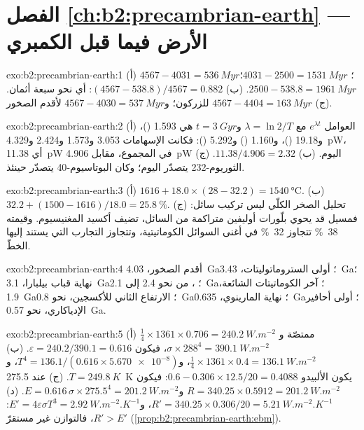 \section*{الفصل \ref{ch:b2:precambrian-earth} --- الأرض فيما قبل الكمبري}

\begin{solution}{exo:b2:precambrian-earth:1}
(أ)  $4567 - 4031 = \qty{536}{Myr}$؛  $4031 - 2500 = \qty{1531}{Myr}$؛
 $2500 - 538.8 = \qty{1961}{Myr}$. (ب) $(4567 - 538.8)/4567 = 0.882$: أي نحو سبعة
أثمان. (ج) $4567 - 4404 = \qty{163}{Myr}$ للزركون؛ و$4567 - 4030 = \qty{537}{Myr}$
لأقدم الصخور.
\end{solution}

\begin{solution}{exo:b2:precambrian-earth:2}
(أ) العوامل $e^{\lambda t}$ مع $\lambda = \ln2/T$ و$t = \qty{3}{Gyr}$ هي 1.593
()، و19.18 ()، و1.160 () و5.292 (): فكانت
الإسهامات 3.053 و1.573 و2.424 و\qty{4.329}{pW}، أي \qty{11.38}{pW} في المجموع، مقابل
\qty{4.906}{pW} اليوم. (ب) $11.38/4.906 = 2.32$. (ج) الثوريوم-232 يتصدّر اليوم؛ وكان البوتاسيوم-40 يتصدّر
حينئذ.
\end{solution}

\begin{solution}{exo:b2:precambrian-earth:3}
(أ) $1616 + 18.0\times(28 - 32.2) = \qty{1540}{\celsius}$. (ب) $32.2 + (1500 - 1616)/18.0 =
\qty{25.8}{\percent}$. (ج) تحليل الصخر الكلّي ليس تركيب سائل: فمسيل
 قد يحوي بلّورات أوليفين متراكمة من السائل، تضيف أكسيد المغنيسيوم. وقيمته
\qty{38}{\percent} تتجاوز \qty{32}{\percent} في أغنى السوائل الكوماتيتية، وتتجاوز
التجارب التي يستند إليها الخطّ.
\end{solution}

\begin{solution}{exo:b2:precambrian-earth:4}
أقدم الصخور، \qty{4.03}{Ga}؛ أولى الستروماتوليتات، \qty{3.43}{Ga}؛ نهاية قباب بيلبارا،
\qty{3.1}{Ga}؛ ، من نحو 2.4 إلى \qty{2.1}{Ga}؛ آخر الكوماتيتات الشائعة،
\qty{1.9}{Ga}؛ الارتفاع الثاني للأكسجين، نحو \qty{0.8}{Ga}؛ نهاية المارينوي،
\qty{0.635}{Ga}؛ أولى أحافير الإدياكاري، نحو \qty{0.57}{Ga}.
\end{solution}

\begin{solution}{exo:b2:precambrian-earth:5}
(أ) $\tfrac14\times1361\times0.706 = \qty{240.2}{W.m^{-2}}$ ممتصّة و$\sigma\times288^4 =
\qty{390.1}{W.m^{-2}}$، فيكون $\varepsilon = 240.2/390.1 = 0.616$. (ب) $\tfrac14\times1361\times0.4
= \qty{136.1}{W.m^{-2}}$، و$T^4 = 136.1/(0.616\times\num{5.670e-8})$، و$T = \qty{249.8}{K}$.
(ج) عند \qty{275.5}{K} يكون الألبيدو $0.6 - 0.306\times12.5/20 = 0.4088$: فيكون $R = 340.25\times0.5912 =
\qty{201.2}{W.m^{-2}}$ و$E = 0.616\,\sigma\times275.5^4 = \qty{201.2}{W.m^{-2}}$. (د) $R' =
340.25\times0.306/20 = \qty{5.21}{W.m^{-2}.K^{-1}}$، و$E' = 4\varepsilon\sigma T^3 =
\qty{2.92}{W.m^{-2}.K^{-1}}$: $R' > E'$، فالتوازن غير مستقرّ
(\cref{prop:b2:precambrian-earth:ebm}).
\end{solution}

